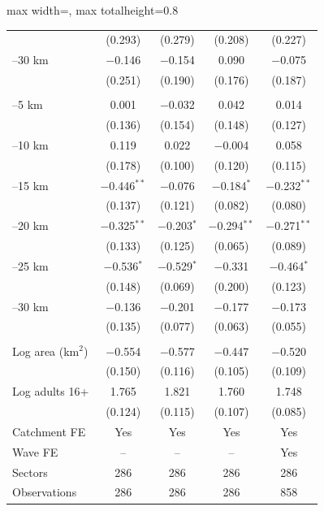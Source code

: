 \documentclass[11pt]{article}
\begin{document}
\begin{table}[H]
\begin{adjustbox}{max width=\textwidth, max totalheight=0.8\textheight}
\begin{tabular}{lcccc}
 & (0.293) & (0.279) & (0.208) & (0.227) \\
\quad 25--30 km & $-$0.146 & $-$0.154 & 0.090 & $-$0.075 \\
 & (0.251) & (0.190) & (0.176) & (0.187) \\
\addlinespace
\multicolumn{5}{l}{\textit{Catchment: Volcanoes}} \\
\quad 0--5 km & 0.001 & $-$0.032 & 0.042 & 0.014 \\
 & (0.136) & (0.154) & (0.148) & (0.127) \\
\quad 5--10 km & 0.119 & 0.022 & $-$0.004 & 0.058 \\
 & (0.178) & (0.100) & (0.120) & (0.115) \\
\quad 10--15 km & $-$0.446$^{**}$ & $-$0.076 & $-$0.184$^{*}$ & $-$0.232$^{**}$ \\
 & (0.137) & (0.121) & (0.082) & (0.080) \\
\quad 15--20 km & $-$0.325$^{**}$ & $-$0.203$^{*}$ & $-$0.294$^{**}$ & $-$0.271$^{**}$ \\
 & (0.133) & (0.125) & (0.065) & (0.089) \\
\quad 20--25 km & $-$0.536$^{*}$ & $-$0.529$^{*}$ & $-$0.331 & $-$0.464$^{*}$ \\
 & (0.148) & (0.069) & (0.200) & (0.123) \\
\quad 25--30 km & $-$0.136 & $-$0.201 & $-$0.177 & $-$0.173 \\
 & (0.135) & (0.077) & (0.063) & (0.055) \\
\addlinespace
\multicolumn{5}{l}{\textit{Controls}} \\
\quad Log area (km$^2$) & $-$0.554 & $-$0.577 & $-$0.447 & $-$0.520 \\
 & (0.150) & (0.116) & (0.105) & (0.109) \\
\quad Log adults 16+ & 1.765 & 1.821 & 1.760 & 1.748 \\
 & (0.124) & (0.115) & (0.107) & (0.085) \\
\midrule
Catchment FE & Yes & Yes & Yes & Yes \\
Wave FE & -- & -- & -- & Yes \\
Sectors & 286 & 286 & 286 & 286 \\
Observations & 286 & 286 & 286 & 858 \\
\bottomrule
\end{tabular}
\end{adjustbox}
\begin{minipage}{0.97\textwidth}\scriptsize

\end{minipage}
\end{table}
\end{document}
